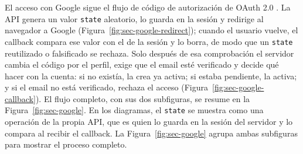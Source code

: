 El acceso con Google sigue el flujo de código de autorización de OAuth 2.0 \cite{rfc6749}. La API genera un valor \texttt{state} aleatorio, lo guarda en la sesión y redirige al navegador a Google (Figura~\ref{fig:sec-google-redirect}); cuando el usuario vuelve, el callback compara ese valor con el de la sesión y lo borra, de modo que un \texttt{state} reutilizado o falsificado se rechaza. Solo después de esa comprobación el servidor cambia el código por el perfil, exige que el email esté verificado y decide qué hacer con la cuenta: si no existía, la crea ya activa; si estaba pendiente, la activa; y si el email no está verificado, rechaza el acceso (Figura~\ref{fig:sec-google-callback}). El flujo completo, con sus dos subfiguras, se resume en la Figura~\ref{fig:sec-google}. En los diagramas, el \texttt{state} se muestra como una operación de la propia API, que es quien lo guarda en la sesión del servidor y lo compara al recibir el callback. La Figura~\ref{fig:sec-google} agrupa ambas subfiguras para mostrar el proceso completo.

